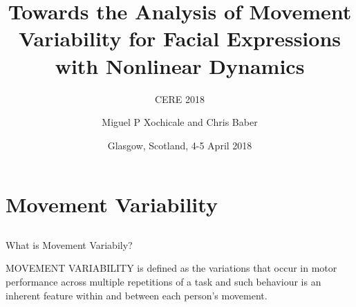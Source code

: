 \documentclass[compress]{beamer}
\title{Towards the Analysis of Movement Variability for Facial Expressions  \\ 
	with Nonlinear Dynamics}
\subtitle{CERE 2018}
\date{Glasgow, Scotland, 4-5 April 2018}
\author{Miguel P Xochicale and Chris Baber}
\institute{School of Engineering \\{\bf University of Birmingham}}
\begin{document}

\maketitle



%

%
\section{Movement Variability}


\subsection{}
{


\begin{frame}{What is Movement Variabily?}

\LARGE
MOVEMENT VARIABILITY is defined as the variations that occur in motor
performance across multiple repetitions of a task and such behaviour is 
an inherent feature within and between each person's movement.
\end{frame}



}



%
\end{document}
